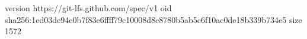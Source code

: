 version https://git-lfs.github.com/spec/v1
oid sha256:1ed03de94e0b7f83e6ffff79c10008d8c8780b5ab5c6f10ac0de18b339b734e5
size 1572
